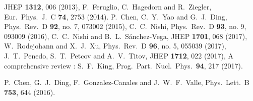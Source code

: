 \documentclass[11pt]{article}
\providecommand{\xlink}[1]
  {\href{http://arxiv.org/abs/#1}{arXiv:#1}}
\begin{document}
\begin{thebibliography}{9}
  JHEP {\bf 1312}, 006 (2013),
 F.~Feruglio, C.~Hagedorn and R.~Ziegler,
  Eur.\ Phys.\ J.\ C {\bf 74}, 2753 (2014).
P.~Chen, C.~Y.~Yao and G.~J.~Ding,
  Phys.\ Rev.\ D {\bf 92}, no. 7, 073002 (2015),
 C.~C.~Nishi,
  Phys.\ Rev.\ D {\bf 93}, no. 9, 093009 (2016),
   C.~C.~Nishi and B.~L.~Sánchez-Vega,
  JHEP {\bf 1701}, 068 (2017),
   W.~Rodejohann and X.~J.~Xu,
  Phys.\ Rev.\ D {\bf 96}, no. 5, 055039 (2017),
   J.~T.~Penedo, S.~T.~Petcov and A.~V.~Titov,
  JHEP {\bf 1712}, 022 (2017),
 A comprehensive review : S.~F.~King,
  Prog.\ Part.\ Nucl.\ Phys.\  {\bf 94}, 217 (2017).

 
  
  P.~Chen, G.~J.~Ding, F.~Gonzalez-Canales and J.~W.~F.~Valle,
  Phys.\ Lett.\ B {\bf 753}, 644 (2016).
  

\end{thebibliography}
\end{document}
